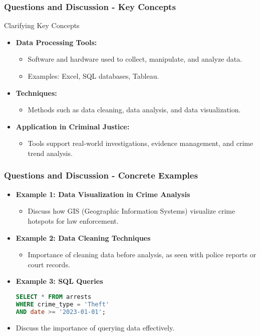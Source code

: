 \documentclass[aspectratio=169]{beamer}
\begin{document}
\begin{frame}[fragile]
    \frametitle{Questions and Discussion - Key Concepts}
    \begin{block}{Clarifying Key Concepts}
        \begin{itemize}
            \item \textbf{Data Processing Tools:}
            \begin{itemize}
                \item Software and hardware used to collect, manipulate, and analyze data.
                \item Examples: Excel, SQL databases, Tableau.
            \end{itemize}
            \item \textbf{Techniques:}
            \begin{itemize}
                \item Methods such as data cleaning, data analysis, and data visualization.
            \end{itemize}
            \item \textbf{Application in Criminal Justice:}
            \begin{itemize}
                \item Tools support real-world investigations, evidence management, and crime trend analysis.
            \end{itemize}
        \end{itemize}
    \end{block}
\end{frame}

\begin{frame}[fragile]
    \frametitle{Questions and Discussion - Concrete Examples}
    \begin{itemize}
        \item \textbf{Example 1: Data Visualization in Crime Analysis}
            \begin{itemize}
                \item Discuss how GIS (Geographic Information Systems) visualize crime hotspots for law enforcement.
            \end{itemize}
        \item \textbf{Example 2: Data Cleaning Techniques}
            \begin{itemize}
                \item Importance of cleaning data before analysis, as seen with police reports or court records.
            \end{itemize}
        \item \textbf{Example 3: SQL Queries}
            \begin{lstlisting}[language=SQL]
SELECT * FROM arrests
WHERE crime_type = 'Theft'
AND date >= '2023-01-01';
            \end{lstlisting}
            \item Discuss the importance of querying data effectively.
    \end{itemize}
\end{frame}
\end{document}
